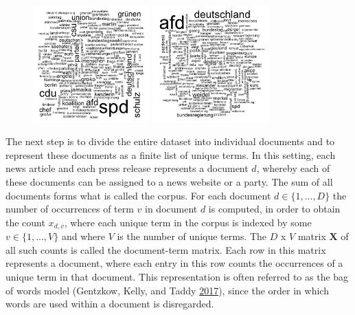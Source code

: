 \documentclass[
]{article}
\begin{document}
\begin{figure}\centering

\includegraphics[width=0.4\textwidth,height=\textheight]{../figs/wordcloud_bild.png}
\includegraphics[width=0.4\textwidth,height=\textheight]{../figs/wordcloud_afd.png}

\end{figure}

The next step is to divide the entire dataset into individual documents
and to represent these documents as a finite list of unique terms. In
this setting, each news article and each press release represents a
document \(d\), whereby each of these documents can be assigned to a
news website or a party. The sum of all documents forms what is called
the corpus. For each document \(d \in \lbrace 1,...,D \rbrace\) the
number of occurrences of term \(v\) in document \(d\) is computed, in
order to obtain the count \(x_{d,v}\), where each unique term in the
corpus is indexed by some \(v \in \lbrace 1,...,V \rbrace\) and where
\(V\) is the number of unique terms. The \(D\) x \(V\) matrix
\(\boldsymbol{X}\) of all such counts is called the document-term
matrix. Each row in this matrix represents a document, where each entry
in this row counts the occurrences of a unique term in that document.
This representation is often referred to as the bag of words model
(Gentzkow, Kelly, and Taddy
\protect\hyperlink{ref-gentzkow_text_2017}{2017}), since the order in
which words are used within a document is disregarded.
\end{document}
